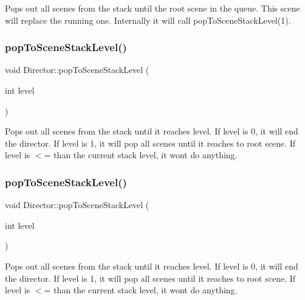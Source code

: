 Pops out all scenes from the stack until the root scene in the queue. This scene will replace the running one. Internally it will call {\ttfamily pop\+To\+Scene\+Stack\+Level(1)}. \mbox{\label{classDirector_a56f61d47f337d996c069ca7aac5b3c79}} 
\subsubsection{\texorpdfstring{pop\+To\+Scene\+Stack\+Level()}{popToSceneStackLevel()}\hspace{0.1cm}{\footnotesize\ttfamily [1/2]}}
{\footnotesize\ttfamily void Director\+::pop\+To\+Scene\+Stack\+Level (\begin{DoxyParamCaption}\item[{int}]{level }\end{DoxyParamCaption})}

Pops out all scenes from the stack until it reaches {\ttfamily level}. If level is 0, it will end the director. If level is 1, it will pop all scenes until it reaches to root scene. If level is $<$= than the current stack level, it won\textquotesingle{}t do anything. \mbox{\label{classDirector_a56f61d47f337d996c069ca7aac5b3c79}} 
\subsubsection{\texorpdfstring{pop\+To\+Scene\+Stack\+Level()}{popToSceneStackLevel()}\hspace{0.1cm}{\footnotesize\ttfamily [2/2]}}
{\footnotesize\ttfamily void Director\+::pop\+To\+Scene\+Stack\+Level (\begin{DoxyParamCaption}\item[{int}]{level }\end{DoxyParamCaption})}

Pops out all scenes from the stack until it reaches {\ttfamily level}. If level is 0, it will end the director. If level is 1, it will pop all scenes until it reaches to root scene. If level is $<$= than the current stack level, it won\textquotesingle{}t do anything. \mbox{\label{classDirector_aed3733d86c85ee8d1f4966801ba5ad19}} 
